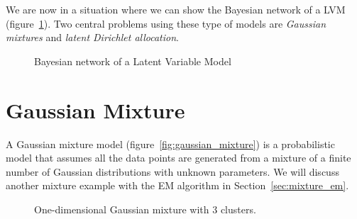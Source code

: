 

We are now in a situation where we can show the Bayesian network of a LVM (figure~\ref{fig:lvm}). Two central problems using these type of models are \emph{Gaussian mixtures} and \emph{latent Dirichlet allocation}.

\begin{figure}[h!]
  \centering
  \caption{Bayesian network of a Latent Variable Model}
  \label{fig:lvm}
\end{figure}



\section{Gaussian Mixture}

A Gaussian mixture model (figure~\ref{fig:gaussian_mixture}) is a probabilistic model that assumes all the data points are generated from a mixture of a finite number of Gaussian distributions with unknown parameters. We will discuss another mixture example with the EM algorithm in Section~\ref{sec:mixture_em}.

\begin{figure}[h!]
  \centering
  \caption{One-dimensional Gaussian mixture with 3 clusters.}
\end{figure}


